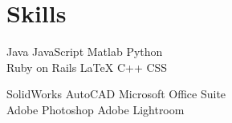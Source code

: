 \documentclass[]{deedy-resume-openfont}
\begin{document}

\section{Skills}

\location{}
\vspace{0.5mm}
\begin{tightemize}
\item[] Java \textbullet{} JavaScript \textbullet{} Matlab \textbullet{} Python \\
Ruby on Rails \textbullet{} \LaTeX \textbullet{} C++ \textbullet{} CSS
\end{tightemize}
\sectionsep

\location{}
\vspace{0.5mm}
\begin{tightemize}
\item[] SolidWorks \textbullet{} AutoCAD \textbullet{} Microsoft Office Suite \\
Adobe Photoshop \textbullet{} Adobe Lightroom
\end{tightemize}
\sectionsep

\end{document}
